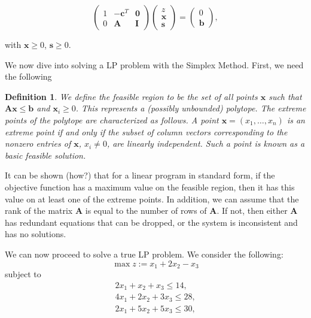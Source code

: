 \documentclass[12pt,english]{article}
\newtheorem{definition}[theorem]{Definition}
\begin{document}
\begin{equation}
\left(
\begin{array}{ccc}
1	&	-\mathbf{c}^T 	&	\mathbf{0} 	\\
0	&	\mathbf{A}		& 	\mathbf{I}
\end{array}
\right)
\left(
\begin{array}{c}
z \\
\mathbf{x} \\
\mathbf{s}
\end{array}
\right)
= 
\left(
\begin{array}{c}
0 \\
\mathbf{b}
\end{array}
\right),
\end{equation}

with $\mathbf{x} \geq 0$, $\mathbf{s} \geq 0$.

We now dive into solving a LP problem with the Simplex Method.  First, we need the following

\begin{definition}\label{def:2.1}
We define the {\it feasible region} to be the set of all points $\mathbf{x}$ such that $\mathbf{A}\mathbf{x} \leq \mathbf{b}$ and $\mathbf{x}_i \geq 0$.  This represents a (possibly unbounded) polytope.  The extreme points of the polytope are characterized as follows.  A point $\mathbf{x} = (x_1, \dots, x_n)$ is an extreme point if and only if the subset of column vectors corresponding to the nonzero entries of $\mathbf{x}$, $x_i \neq 0$, are linearly independent.  Such a point is known as a basic feasible solution.
\end{definition}

It can be shown (how?) that for a linear program in standard form, if the objective function has a maximum value on the feasible region, then it has this value on at least one of the extreme points.   In addition, we can assume that the rank of the matrix $\mathbf{A}$ is equal to the number of rows of $\mathbf{A}$.  If not, then either $\mathbf{A}$ has redundant equations that can be dropped, or the system is inconsistent and has no solutions.

We can now proceed to solve a true LP problem.  We consider the following:
$$
\max z := x_1 +2 x_2 - x_3
$$
subject to
$$
\begin{array}{c}
2 x_1 + x_2 + x_3 \leq 14, \\
4 x_1 + 2 x_2 + 3 x_3 \leq 28, \\
2 x_1 + 5 x_2 + 5 x_3 \leq 30,
\end{array}
$$
\end{document}
